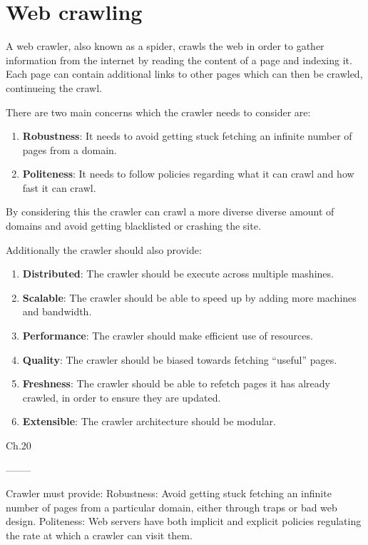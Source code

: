 \section{Web crawling}

A web crawler, also known as a spider, crawls the web in order to gather
information from the internet by reading the content of a page and indexing it.
Each page can contain additional links to other pages which can then be
crawled, continueing the crawl.

There are two main concerns which the crawler needs to consider are:
\begin{enumerate}
  \item \textbf{Robustness}: It needs to avoid getting stuck fetching an
  infinite number of pages from a domain.
  \item \textbf{Politeness}: It needs to follow policies regarding what it can
  crawl and how fast it can crawl. 
\end{enumerate}

By considering this the crawler can crawl a more diverse diverse amount of
domains and avoid getting blacklisted or crashing the site.

Additionally the crawler should also provide:
\begin{enumerate}
  \item \textbf{Distributed}: The crawler should be execute across multiple
  mashines.
  \item \textbf{Scalable}: The crawler should be able to speed up by adding more
  machines and bandwidth.
  \item \textbf{Performance}: The crawler should make efficient use of
  resources.
  \item \textbf{Quality}: The crawler should be biased towards fetching
  ``useful'' pages.
  \item \textbf{Freshness}: The crawler should be able to refetch pages it has
  already crawled, in order to ensure they are updated.
  \item \textbf{Extensible}: The crawler architecture should be modular.
\end{enumerate}
\citep{manning2008introduction}{Ch.20}






--------

Crawler must provide:
Robustness: Avoid getting stuck fetching an infinite number of pages from a particular domain, either through traps or bad web design.
Politeness: Web servers have both implicit and explicit policies regulating the rate at which a crawler can visit them. 

